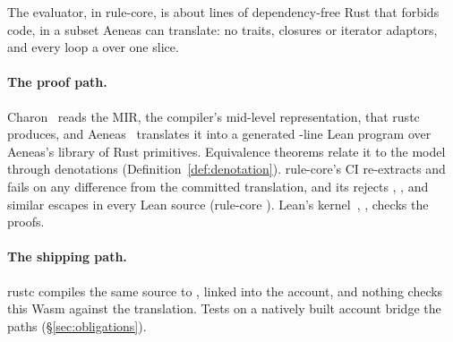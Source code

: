 The evaluator,  in rule-core, is about
 lines of dependency-free  Rust that forbids
 code, in a subset Aeneas can translate: no traits, closures or
iterator adaptors, and every loop a  over one slice.

\paragraph{The proof path.} Charon~\cite{charon}  reads the MIR, the
compiler's mid-level representation, that rustc 
produces, and Aeneas~\cite{aeneas}  translates it into a
generated -line Lean program over Aeneas's library of
Rust primitives. Equivalence theorems relate it to the model through denotations
(Definition~\ref{def:denotation}). rule-core's CI re-extracts and fails on any
difference from the committed translation, and its  rejects
, ,  and similar escapes in every Lean source
(rule-core ). Lean's kernel~\cite{lean4},
, checks the proofs.

\paragraph{The shipping path.} rustc  compiles the same source
to , linked into the account, and nothing checks this Wasm
against the translation. Tests on a natively built account bridge the paths
(\S\ref{sec:obligations}).

